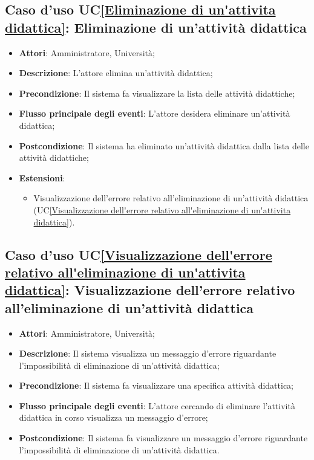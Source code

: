 \subsection{Caso d'uso UC\ref{Eliminazione di un'attivita didattica}: Eliminazione di un'attività didattica}
\begin{itemize}
	\item \textbf{Attori}: Amministratore, Università;
	\item \textbf{Descrizione}: L'attore elimina un'attività didattica;
	
	\item \textbf{Precondizione}: Il sistema fa visualizzare la lista delle attività didattiche;
	
	\item \textbf{Flusso principale degli eventi}: L'attore desidera eliminare un'attività didattica;
	
	\item \textbf{Postcondizione}: Il sistema ha eliminato un'attività didattica dalla lista delle attività didattiche;
	
	\item \textbf{Estensioni}:
	\begin{itemize}
		\item Visualizzazione dell'errore relativo all'eliminazione di un'attività didattica (UC\ref{Visualizzazione dell'errore relativo all'eliminazione di un'attivita didattica}).
	\end{itemize}
\end{itemize}

\subsection{Caso d'uso UC\ref{Visualizzazione dell'errore relativo all'eliminazione di un'attivita didattica}: Visualizzazione dell'errore relativo all'eliminazione di un'attività didattica}
\begin{itemize}
	\item \textbf{Attori}: Amministratore, Università;
	\item \textbf{Descrizione}: Il sistema visualizza un messaggio d'errore riguardante l'impossibilità di eliminazione di un'attività didattica;
	
	\item \textbf{Precondizione}: Il sistema fa visualizzare una specifica attività didattica;
	
	\item \textbf{Flusso principale degli eventi}: L'attore cercando di eliminare l'attività didattica in corso visualizza un messaggio d'errore;
	
	\item \textbf{Postcondizione}: Il sistema fa visualizzare un messaggio d'errore riguardante l'impossibilità di eliminazione di un'attività didattica.
	
\end{itemize}


